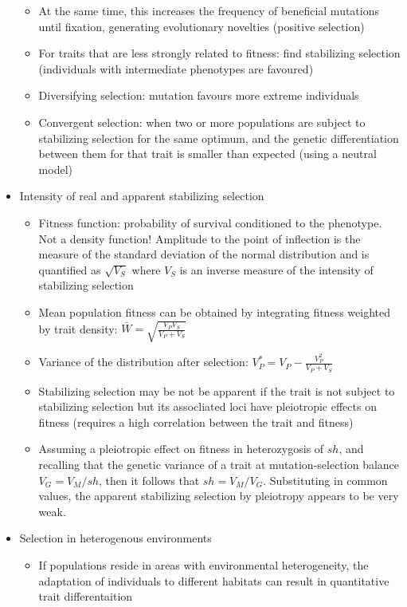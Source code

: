 \documentclass[12pt]{amsart}
\begin{document}
\begin{itemize}
\begin{itemize}
\item At the same time, this increases the frequency of beneficial mutations until fixation, generating evolutionary novelties (positive selection)
\item For traits that are less strongly related to fitness: find stabilizing selection (individuals with intermediate phenotypes are favoured)
\item Diversifying selection: mutation favours more extreme individuals 
\item Convergent selection: when two or more populations are subject to stabilizing selection for the same optimum, and the genetic differentiation between them for that trait is smaller than expected (using a neutral model) 
\end{itemize}
\item Intensity of real and apparent stabilizing selection
\begin{itemize}
\item Fitness function: probability of survival conditioned to the phenotype. Not a density function! Amplitude to the point of inflection is the measure of the standard deviation of the normal distribution and is quantified as $\sqrt{V_S}$ where $V_S$ is an inverse measure of the intensity of stabilizing selection 
\item Mean population fitness can be obtained by integrating fitness weighted by trait density: $\bar{W} = \sqrt{\frac{V_PV_S}{V_P + V_S}}$
\item Variance of the distribution after selection: $V_P^* = V_P - \frac{V_P^2}{V_P + V_S}$
\item Stabilizing selection may be not be apparent if the trait is not subject to stabilizing selection but its assocliated loci have pleiotropic effects on fitness (requires a high  correlation between the trait and fitness)
\item Assuming a pleiotropic effect on fitness in heterozygosis of $sh$, and recalling that the genetic variance of a trait at mutation-selection balance $V_G = V_M/sh$, then it follows that $sh = V_M/V_G$. Substituting in common values, the apparent stabilizing selection by pleiotropy appears to be very weak.
\end{itemize}
\item Selection in heterogenous environments
\begin{itemize}
\item If populations reside in areas with environmental heterogeneity, the adaptation of individuals to different habitats can result in quantitative trait differentaition

\end{itemize}
\end{itemize}
\end{document}
